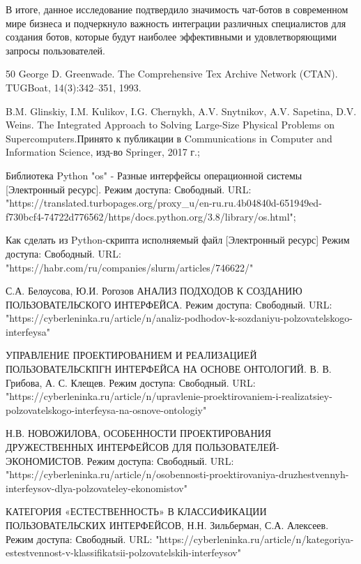 \documentclass{article}
\begin{document}
В итоге, данное исследование подтвердило значимость чат-ботов в современном мире бизнеса и подчеркнуло важность интеграции различных специалистов для создания ботов, которые будут наиболее эффективными и удовлетворяющими запросы пользователей.




\begin{thebibliography} {50}
 George D. Greenwade. The Comprehensive Tex Archive Network (CTAN). TUGBoat, 14(3):342–351, 1993.

B.M. Glinskiy, I.M. Kulikov, I.G. Chernykh, A.V. Snytnikov, A.V. Sapetina, D.V. Weins.  The Integrated Approach to Solving Large-Size Physical Problems on Supercomputers.Принято к публикации в Communications in Computer and Information Science, изд-во Springer, 2017 г.;

Библиотека Python "os" - Разные интерфейсы операционной системы [Электронный ресурс]. Режим доступа:  Свободный. URL: "https://translated.turbopages.org/proxy_u/en-ru.ru.4b04840d-651949ed-f730bcf4-74722d776562/https/docs.python.org/3.8/library/os.html";

Как сделать из Python-скрипта исполняемый файл [Электронный ресурс] Режим доступа: Свободный. URL: "https://habr.com/ru/companies/slurm/articles/746622/"

С.А. Белоусова, Ю.И. Рогозов
АНАЛИЗ ПОДХОДОВ К СОЗДАНИЮ ПОЛЬЗОВАТЕЛЬСКОГО ИНТЕРФЕЙСА. Режим доступа: Свободный. URL: "https://cyberleninka.ru/article/n/analiz-podhodov-k-sozdaniyu-polzovatelskogo-interfeysa"

УПРАВЛЕНИЕ ПРОЕКТИРОВАНИЕМ И РЕАЛИЗАЦИЕЙ ПОЛЬЗОВАТЕЛЬСКПГН ИНТЕРФЕЙСА НА 
ОСНОВЕ ОНТОЛОГИЙ. В. В. Грибова, А. С. Клещев. Режим доступа: Свободный. URL: "https://cyberleninka.ru/article/n/upravlenie-proektirovaniem-i-realizatsiey-
polzovatelskogo-interfeysa-na-osnove-ontologiy"

Н.В. НОВОЖИЛОВА, ОСОБЕННОСТИ ПРОЕКТИРОВАНИЯ ДРУЖЕСТВЕННЫХ ИНТЕРФЕЙСОВ ДЛЯ ПОЛЬЗОВАТЕЛЕЙ-
ЭКОНОМИСТОВ. Режим доступа: Свободный. URL: "https://cyberleninka.ru/article/n/osobennosti-proektirovaniya-druzhestvennyh-interfeysov-dlya-polzovateley-ekonomistov"

КАТЕГОРИЯ «ЕСТЕСТВЕННОСТЬ» В КЛАССИФИКАЦИИ ПОЛЬЗОВАТЕЛЬСКИХ ИНТЕРФЕЙСОВ, Н.Н. Зильберман, С.А. Алексеев. Режим доступа: Свободный. URL: "https://cyberleninka.ru/article/n/kategoriya-estestvennost-v-klassifikatsii-polzovatelskih-interfeysov"


\end{thebibliography}
\end{document}
